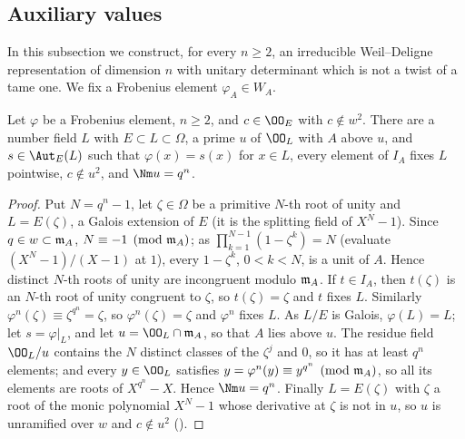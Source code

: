 \subsection{Auxiliary values}\label{pf:llc:sec-junk}

In this subsection we construct, for every $n\ge2$, an irreducible Weil--Deligne representation of dimension
$n$ with unitary determinant which is not a twist of a tame one. We fix a Frobenius element
$\varphi_A\in W_A$.

\begin{lemma}\label{pf:llc:nfext}
Let $\varphi$ be a Frobenius element, $n\ge2$, and $c\in\OO_E$ with $c\notin w^2$. There are a number field $L$
with $E\subset L\subset\Omega$, a prime $u$ of $\OO_L$ with $A$ above $u$, and $s\in\Aut_E(L)$ such that
$\varphi(x)=s(x)$ for $x\in L$, every element of $I_A$ fixes $L$ pointwise, $c\notin u^2$, and $\Nm u=q^n$.
\end{lemma}

\begin{proof}
Put $N=q^n-1$, let $\zeta\in\Omega$ be a primitive $N$-th root of unity and $L=E(\zeta)$, a Galois extension of $E$ (it
is the splitting field of $X^N-1$). Since $q\in w\subset\mathfrak m_A$, $N\equiv-1\pmod{\mathfrak m_A}$; as
$\prod_{k=1}^{N-1}(1-\zeta^k)=N$ (evaluate $(X^N-1)/(X-1)$ at $1$), every $1-\zeta^k$, $0<k<N$, is a unit of $A$.
Hence distinct $N$-th roots of unity are incongruent modulo $\mathfrak m_A$. If $t\in I_A$, then $t(\zeta)$ is an $N$-th root
of unity congruent to $\zeta$, so $t(\zeta)=\zeta$ and $t$ fixes $L$. Similarly $\varphi^n(\zeta)\equiv\zeta^{q^n}=\zeta$,
so $\varphi^n(\zeta)=\zeta$ and $\varphi^n$ fixes $L$. As $L/E$ is Galois, $\varphi(L)=L$; let $s=\varphi|_L$, and let $u=\OO_L\cap\llcm_A$,
so that $A$ lies above $u$. The residue field $\OO_L/u$ contains the $N$ distinct classes of the $\zeta^j$ and $0$, so
it has at least $q^n$ elements; and every $y\in\OO_L$ satisfies $y=\varphi^n(y)\equiv y^{q^n}\pmod{\mathfrak m_A}$, so all its
elements are roots of $X^{q^n}-X$. Hence $\Nm u=q^n$. Finally $L=E(\zeta)$ with $\zeta$ a root of the monic
polynomial $X^N-1$ whose derivative at $\zeta$ is not in $u$, so $u$ is unramified over $w$ and $c\notin u^2$
().
\end{proof}

